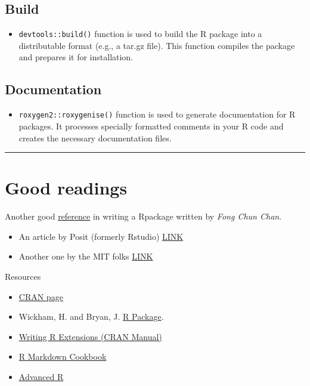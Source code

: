 \documentclass[
  letterpaper,
  DIV=11,
  numbers=noendperiod]{scrreprt}
\providecommand{\tightlist}{%
  \setlength{\itemsep}{0pt}\setlength{\parskip}{0pt}}
\begin{document}
\subsection{Build}\label{build}

\begin{itemize}
\tightlist
\item
  \texttt{devtools::build()} function is used to build the R package
  into a distributable format (e.g., a tar.gz file). This function
  compiles the package and prepares it for installation.
\end{itemize}

\subsection{Documentation}\label{documentation}

\begin{itemize}
\tightlist
\item
  \texttt{roxygen2::roxygenise()} function is used to generate
  documentation for R packages. It processes specially formatted
  comments in your R code and creates the necessary documentation files.
\end{itemize}

\begin{center}\rule{0.5\linewidth}{0.5pt}\end{center}

\section{Good readings}\label{good-readings}

Another good
\href{\%5Bhttps://tinyheero.github.io/jekyll/update/2015/07/26/making-your-first-R-package.html\%5D}{reference}
in writing a Rpackage written by \emph{Fong Chun Chan}.

\begin{itemize}
\item
  An article by Posit (formerly Rstudio)
  \href{https://docs.posit.co/ide/user/ide/guide/pkg-devel/writing-packages.html}{LINK}
\item
  Another one by the MIT folks
  \href{https://web.mit.edu/insong/www/pdf/rpackage_instructions.pdf}{LINK}
\end{itemize}

Resources

\begin{itemize}
\item
  \href{https://cran.r-project.org/web/packages/distributions/index.html}{CRAN
  page}
\item
  Wickham, H. and Bryan, J. \href{https://r-pkgs.org/}{R Package}.
\item
  \href{https://cran.r-project.org/doc/manuals/r-release/R-exts.html}{Writing
  R Extensions (CRAN Manual)}
\item
  \href{https://bookdown.org/yihui/rmarkdown/}{R Markdown Cookbook}
\item
  \href{https://adv-r.hadley.nz/}{Advanced R}
\end{itemize}
\end{document}

